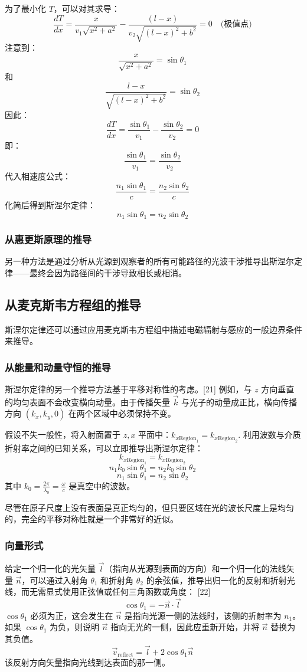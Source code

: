 为了最小化 \( T \)，可以对其求导：
\[
\frac{dT}{dx} = \frac{x}{v_1 \sqrt{x^2 + a^2}} - \frac{(l - x)}{v_2 \sqrt{(l - x)^2 + b^2}} = 0 \quad \text{(极值点)}~
\]
注意到：
\[
\frac{x}{\sqrt{x^2 + a^2}} = \sin \theta_1~
\]
和
\[
\frac{l - x}{\sqrt{(l - x)^2 + b^2}} = \sin \theta_2~
\]
因此：
\[
\frac{dT}{dx} = \frac{\sin \theta_1}{v_1} - \frac{\sin \theta_2}{v_2} = 0~
\]
即：
\[
\frac{\sin \theta_1}{v_1} = \frac{\sin \theta_2}{v_2}~
\]
代入相速度公式：
\[
\frac{n_1 \sin \theta_1}{c} = \frac{n_2 \sin \theta_2}{c}~
\]
化简后得到斯涅尔定律：
\[
n_1 \sin \theta_1 = n_2 \sin \theta_2~
\]
\subsubsection{从惠更斯原理的推导} 
另一种方法是通过分析从光源到观察者的所有可能路径的光波干涉推导出斯涅尔定律——最终会因为路径间的干涉导致相长或相消。  
\subsection{从麦克斯韦方程组的推导}  
斯涅尔定律还可以通过应用麦克斯韦方程组中描述电磁辐射与感应的一般边界条件来推导。
\subsubsection{从能量和动量守恒的推导}  
斯涅尔定律的另一个推导方法基于平移对称性的考虑。[21] 例如，与 \( z \) 方向垂直的均匀表面不会改变横向动量。由于传播矢量 \(\vec{k}\) 与光子的动量成正比，横向传播方向 \((k_x, k_y, 0)\) 在两个区域中必须保持不变。  

假设不失一般性，将入射面置于 \( z, x \) 平面中：\(k_{x\text{Region}_1} = k_{x\text{Region}_2}.\) 
利用波数与介质折射率之间的已知关系，可以立即推导出斯涅尔定律：  
\[
k_{x\text{Region}_1} = k_{x\text{Region}_2}~
\]
\[
n_1 k_0 \sin \theta_1 = n_2 k_0 \sin \theta_2~
\]
\[
n_1 \sin \theta_1 = n_2 \sin \theta_2~
\]
其中  
\( k_0 = \frac{2\pi}{\lambda_0} = \frac{\omega}{c} \) 是真空中的波数。  

尽管在原子尺度上没有表面是真正均匀的，但只要区域在光的波长尺度上是均匀的，完全的平移对称性就是一个非常好的近似。
\subsubsection{向量形式}  
给定一个归一化的光矢量 \( \vec{l} \)（指向从光源到表面的方向）和一个归一化的法线矢量 \( \vec{n} \)，可以通过入射角 \( \theta_1 \) 和折射角 \( \theta_2 \) 的余弦值，推导出归一化的反射和折射光线，而无需显式使用正弦值或任何三角函数或角度： [22]  
\[
\cos \theta_1 = -\vec{n} \cdot \vec{l}~
\]
\(\cos \theta_1\) 必须为正，这会发生在 \( \vec{n} \) 是指向光源一侧的法线时，该侧的折射率为 \( n_1 \)。如果 \(\cos \theta_1\) 为负，则说明 \( \vec{n} \) 指向无光的一侧，因此应重新开始，并将 \( \vec{n} \) 替换为其负值。  
\[
\vec{v}_{\mathrm{reflect}} = \vec{l} + 2\cos \theta_1 \vec{n}~
\]
该反射方向矢量指向光线到达表面的那一侧。

